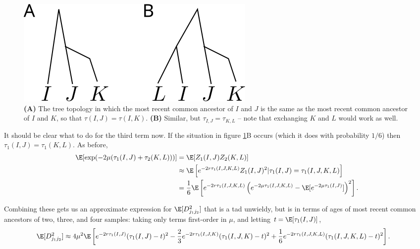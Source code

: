\begin{figure}[ht!]
  \begin{center}
    \includegraphics{coal-time-correlation}
  \end{center}
  \caption{
    \textbf{(A)} The tree topology in which the most recent common ancestor of $I$ and $J$ 
    is the same as the most recent common ancestor of $I$ and $K$, so that $\tau(I,J) = \tau(I,K)$.
    \textbf{(B)} Similar, but $\tau_{I,J} = \tau_{K,L}$ -- note that exchanging $K$ and $L$ would work as well.
    \label{fig:coal_time_correlation}
  }
\end{figure}

It should be clear what to do for the third term now.
If the situation in figure \ref{fig:coal_time_correlation}B occurs (which it does with probability $1/6$)
then $\tau_1(I,J) = \tau_1(K,L)$.
As before,
\begin{align}
  \E[ \exp(-2\mu(\tau_1(I,J)+\tau_2(K,L))) ] &= \E[ Z_1(I,J) Z_2(K,L) ] \\
  &\approx \E \left[ e^{-2r \tau_1(I,J,K,L)} Z_1(I,J)^2 \vert \tau_1(I,J) = \tau_1(I,J,K,L)  \right] \\
  &= \frac{1}{6} \E \left[ e^{-2r \tau_1(I,J,K,L)} \left( e^{-2\mu \tau_1(I,J,K,L)} - \E[e^{-2\mu \tau_1(I,J)}] \right)^2 \right] .
\end{align}

Combining these gets us an approximate expression for $\E[D_{j_1 j_2}^2]$ 
that is a tad unwieldy,
but is in terms of ages of most recent common ancestors of two, three, and four samples:
taking only terms first-order in $\mu$,
and letting $t = \E[\tau_1(I,J)]$,
\begin{align}
  \E[ D_{j_1 j_2}^2 ] &\approx 4 \mu^2 \E\left[
    e^{-2r \tau_1(I,J)} ( \tau_1(I,J) - t )^2 
    - \frac{2}{3} e^{-2r \tau_1(I,J,K)} ( \tau_1(I,J,K) - t )^2 
    + \frac{1}{6} e^{-2r \tau_1(I,J,K,L)} ( \tau_1(I,J,K,L) - t )^2 
    \right] .
\end{align}


